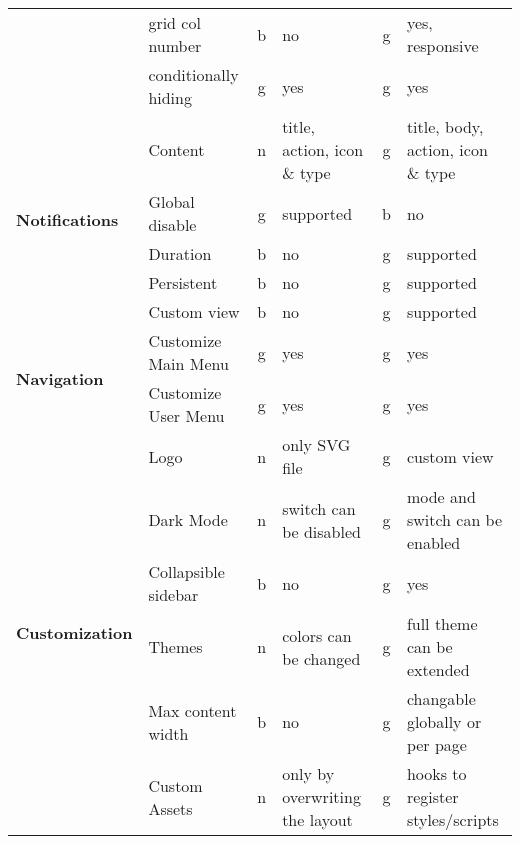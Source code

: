 \begin{table}[!ht]
{\begin{tabular}{llclcl}
            & grid col number        & b  & no                             & g  & yes, responsive                         \\
            & conditionally hiding   & g  & yes                            & g  & yes                                     \\
            \hline
            \multirow{5}{*}{\textbf{Notifications}}  & Content                & n  & title, action, icon \& type     & g  & title, body, action, icon \& type        \\
            & Global disable         & g  & supported                      & b  & no                                      \\
            & Duration               & b  & no                             & g  & supported                               \\
            & Persistent             & b  & no                             & g  & supported                               \\
            & Custom view            & b  & no                             & g  & supported                               \\
            \hline
            \multirow{2}{*}{\textbf{Navigation}}     & Customize Main Menu    & g  & yes                            & g  & yes                                     \\
            & Customize User Menu    & g  & yes                            & g  & yes                                     \\
            \hline
            \multirow{10}{*}{\textbf{Customization}} & Logo                   & n  & only SVG file                  & g  & custom view                             \\
            & Dark Mode              & n  & switch can be disabled         & g  & mode and switch can be enabled          \\
            & Collapsible sidebar    & b  & no                             & g  & yes                                     \\
            & Themes                 & n  & colors can be changed          & g  & full theme can be extended              \\
            & Max content width      & b  & no                             & g  & changable globally or per page          \\
            & Custom Assets          & n  & only by overwriting the layout & g  & hooks to register styles/scripts        \\

\end{tabular}}
\end{table}
